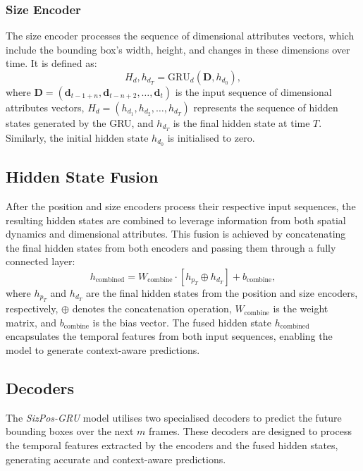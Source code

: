 \documentclass[12pt,oneside]{book} %
\begin{document}
\subsubsection*{Size Encoder}
The size encoder processes the sequence of dimensional attributes vectors, which include the bounding box’s width, height, and changes in these dimensions over time. It is defined as:
\begin{equation}
    H_d, h_{d_T} = \text{GRU}_d(\mathbf{D}, h_{d_0}),
\end{equation}
where $\mathbf{D} = (\mathbf{d}_{t-1+n}, \mathbf{d}_{t-n+2}, \ldots, \mathbf{d}_t)$ is the input sequence of dimensional attributes vectors, $H_d = (h_{d_1}, h_{d_2}, \ldots, h_{d_T})$ represents the sequence of hidden states generated by the GRU, and $h_{d_T}$ is the final hidden state at time $T$. Similarly, the initial hidden state $h_{d_0}$ is initialised to zero.

\subsection{Hidden State Fusion}
After the position and size encoders process their respective input sequences,
the resulting hidden states are combined to leverage information from both
spatial dynamics and dimensional attributes. This fusion is achieved by
concatenating the final hidden states from both encoders and passing them
through a fully connected layer:
\begin{equation}
    h_{\text{combined}} = W_{\text{combine}} \cdot \left[h_{p_T} \oplus h_{d_T}\right] + b_{\text{combine}},
\end{equation}
where $h_{p_T}$ and $h_{d_T}$ are the final hidden states from the position and size encoders, respectively, $\oplus$ denotes the concatenation operation, $W_{\text{combine}}$ is the weight matrix, and $b_{\text{combine}}$ is the bias vector. The fused hidden state $h_{\text{combined}}$ encapsulates the temporal features from both input sequences, enabling the model to generate context-aware predictions.

\subsection{Decoders}
The \textit{SizPos-GRU} model utilises two specialised decoders to predict the
future bounding boxes over the next \(m\) frames. These decoders are designed
to process the temporal features extracted by the encoders and the fused hidden
states, generating accurate and context-aware predictions.
\end{document}
